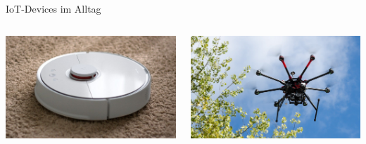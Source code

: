 \begin{frame}{IoT-Devices im Alltag}
    \begin{columns}
        \begin{column}[b]{.45\textwidth}
            \begin{center}
                \includegraphics[width=\textwidth]{img/saugroboter}
            \end{center}
        \end{column}
        \begin{column}[b]{.45\textwidth}
            \begin{center}
                \includegraphics[width=\textwidth]{img/drone}
            \end{center}
        \end{column}
    \end{columns}
\end{frame}

